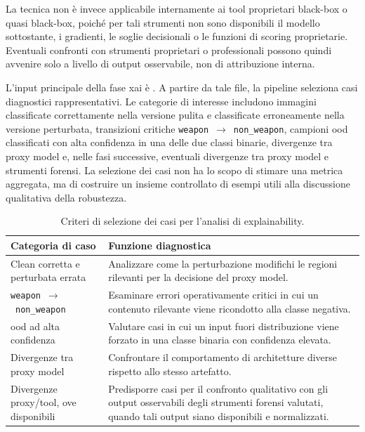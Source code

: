La tecnica non è invece applicabile internamente ai tool proprietari black-box o
quasi black-box, poiché per tali strumenti non sono disponibili il modello
sottostante, i gradienti, le soglie decisionali o le funzioni di scoring
proprietarie. Eventuali confronti con strumenti proprietari o professionali
possono quindi avvenire solo a livello di output osservabile, non di attribuzione
interna.

L'input principale della fase \gls{xai} è
. A partire da
tale file, la pipeline seleziona casi diagnostici rappresentativi. Le categorie
di interesse includono immagini classificate correttamente nella versione pulita
e classificate erroneamente nella versione perturbata, transizioni critiche
\texttt{weapon}~$\rightarrow$~\texttt{non\_weapon}, campioni \gls{ood}
classificati con alta confidenza in una delle due classi binarie, divergenze tra
proxy model e, nelle fasi successive, eventuali divergenze tra proxy model e
strumenti forensi. La selezione dei casi non ha lo scopo di stimare
una metrica aggregata, ma di costruire un insieme controllato di esempi utili
alla discussione qualitativa della robustezza.

\begin{table}[H]
\centering
\caption{Criteri di selezione dei casi per l'analisi di explainability.}
\label{tab:methodology-xai-case-selection}
\begin{tabularx}{\textwidth}{@{}lX@{}}
\toprule
\textbf{Categoria di caso} & \textbf{Funzione diagnostica} \\
\midrule
Clean corretta e perturbata errata
&
Analizzare come la perturbazione modifichi le regioni rilevanti per la decisione
del proxy model. \\
\texttt{weapon}~$\rightarrow$~\texttt{non\_weapon}
&
Esaminare errori operativamente critici in cui un contenuto rilevante viene
ricondotto alla classe negativa. \\
\gls{ood} ad alta confidenza
&
Valutare casi in cui un input fuori distribuzione viene forzato in una classe
binaria con confidenza elevata. \\
Divergenze tra proxy model
&
Confrontare il comportamento di architetture diverse rispetto allo stesso
artefatto. \\
Divergenze proxy/tool, ove disponibili
&
Predisporre casi per il confronto qualitativo con gli output osservabili degli
strumenti forensi valutati, quando tali output siano disponibili e normalizzati. \\
\bottomrule
\end{tabularx}
\end{table}


